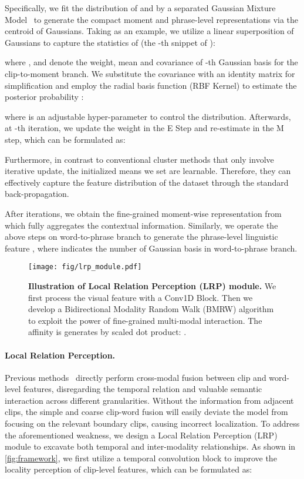 \documentclass[10pt,twocolumn,letterpaper]{article}
\begin{document}
Specifically, we fit the distribution of  and  by a separated Gaussian Mixture Model~\cite{gmm} to generate the compact moment and phrase-level representations via the centroid of Gaussians.
Taking  as an example,
we utilize a linear superposition of  Gaussians to capture the statistics of  (the -th snippet of ):

where ,  and  denote the weight, mean and covariance of -th Gaussian basis for the clip-to-moment branch.
We substitute the covariance with an identity matrix  for simplification and employ the radial basis function (RBF Kernel)  to estimate the posterior probability :

where  is an adjustable hyper-parameter to control the distribution.
Afterwards, at -th iteration, we update the weight  in the E Step and re-estimate  in the M step, which can be formulated as:

Furthermore, in contrast to conventional cluster methods that only involve iterative update, the initialized means  we set are learnable.
Therefore, they can effectively capture the feature distribution of the dataset through the standard back-propagation.

After  iterations, we obtain the fine-grained moment-wise representation  from  which fully aggregates the contextual information.
Similarly, we operate the above steps on word-to-phrase branch to generate the phrase-level linguistic feature , where  indicates the number of Gaussian basis in word-to-phrase branch. 

\begin{figure}
    \centering
    \texttt{[image: fig/lrp\_module.pdf]}
    \caption{\textbf{Illustration of Local Relation Perception (LRP) module.} We first process the visual feature  with a Conv1D Block. Then we develop a Bidirectional Modality Random Walk (BMRW) algorithm to exploit the power of fine-grained multi-modal interaction. The affinity  is generates by scaled dot product: .}
    \label{fig:lrp_module}
    \vspace{-10pt}
\end{figure}
\vspace{-10pt}
\paragraph{Local Relation Perception.}
Previous methods~\cite{momentdetr, umt, qddetr} directly perform cross-modal fusion between clip and word-level features, disregarding the temporal relation and valuable semantic interaction across different granularities. Without the information from adjacent clips, the simple and coarse clip-word fusion will easily deviate the model from focusing on the relevant boundary clips, causing incorrect localization. 
To address the aforementioned weakness, we design a Local Relation Perception (LRP) module to excavate both temporal and inter-modality relationships.
As shown in \cref{fig:framework}, we first utilize a temporal convolution block to improve the locality perception of clip-level features, which can be formulated as:
\end{document}
